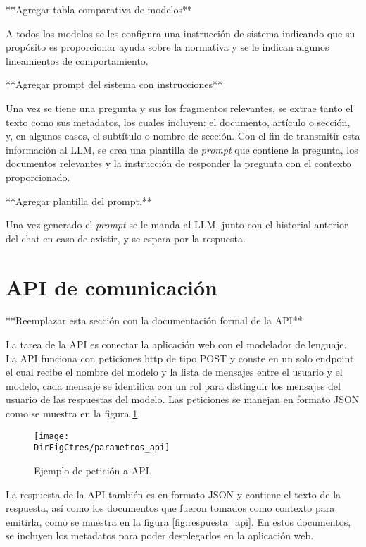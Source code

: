 **Agregar tabla comparativa de modelos**

A todos los modelos se les configura una instrucción de sistema indicando
que su propósito es proporcionar ayuda sobre la normativa y se le indican
algunos lineamientos de comportamiento.

**Agregar prompt del sistema con instrucciones**

Una vez se tiene una pregunta y sus los fragmentos relevantes, se extrae
tanto el texto como sus metadatos, los cuales incluyen: el documento, artículo
o sección, y, en algunos casos, el subtítulo o nombre de sección.
Con el fin de transmitir esta información al LLM, se crea una plantilla de
\textit{prompt} que contiene la pregunta, los documentos relevantes y la
instrucción de responder la pregunta con el contexto proporcionado.

**Agregar plantilla del prompt.**

Una vez generado el \textit{prompt} se le manda al LLM, junto con el historial
anterior del chat en caso de existir, y se espera por la respuesta.

\section{API de comunicación}

**Reemplazar esta sección con la documentación formal de la API**

La tarea de la API es conectar la aplicación web con el modelador de lenguaje.
La API funciona con peticiones http de tipo POST y conste en un solo endpoint
el cual recibe el nombre del modelo y la lista de mensajes entre el
usuario y el modelo, cada mensaje se identifica con un rol para distinguir
los mensajes del usuario de las respuestas del modelo. Las peticiones se
manejan en formato JSON como se muestra en la figura \ref{fig:parametros_api}.

\begin{figure}[]
    \centering
    \texttt{[image: \\DirFigCtres/parametros\_api]}
    \caption{Ejemplo de petición a API.}
    \label{fig:parametros_api}
\end{figure}

La respuesta de la API también es en formato JSON y contiene el texto de la
respuesta, así como los documentos que fueron tomados como contexto para
emitirla, como se muestra en la figura \ref{fig:respuesta_api}. En estos
documentos, se incluyen los metadatos para poder desplegarlos en la aplicación
web.

